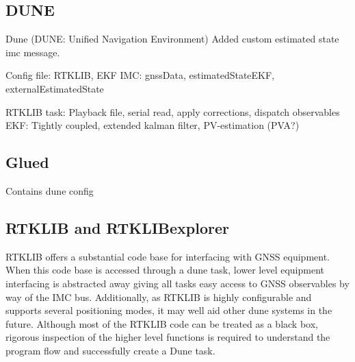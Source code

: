 \subsection{DUNE} 
    Dune (DUNE: Unified Navigation Environment)
    Added custom estimated state imc message.
    
    Config file:    RTKLIB, EKF
    IMC:            gnssData, estimatedStateEKF, externalEstimatedState
    
    RTKLIB task:    Playback file, serial read, apply corrections, dispatch observables
    EKF:            Tightly coupled, extended kalman filter, PV-estimation (PVA?)

\subsection{Glued}
    Contains dune config

\subsection{RTKLIB and RTKLIBexplorer}
    RTKLIB offers a substantial code base for interfacing with GNSS equipment. When this code base is accessed through a  dune task, lower level equipment interfacing is abstracted away giving all tasks easy access to GNSS observables by way of the IMC bus. Additionally, as RTKLIB is highly configurable and supports several positioning modes, it may well aid other dune systems in the future. Although most of the RTKLIB code can be treated as a black box, rigorous inspection of the higher level functions is required to understand the program flow and successfully create a Dune task. 
    


    

